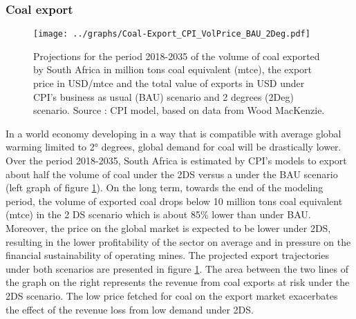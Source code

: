 \documentclass[12pt,english]{article}
\begin{document}
\subsubsection{Coal export}



\begin{figure}[!h]
	\centering
	\texttt{[image: ../graphs/Coal-Export\_CPI\_VolPrice\_BAU\_2Deg.pdf]}
	\caption{\label{Coal-Export_CPI_VolPrice_BAU_2Deg}\small Projections for the period 2018-2035 of the volume of coal exported by South Africa in million tons coal equivalent (mtce), the export price in USD/mtce and the total value of exports in USD under CPI's business as usual (BAU) scenario and 2 degrees (2Deg) scenario. Source : CPI model, based on data from Wood MacKenzie.}
\end{figure}

In a world economy developing in a way that is compatible with average global warming limited to 2° degrees, global demand for coal will be drastically lower. Over the period 2018-2035, South Africa is estimated by CPI's models to export about half the volume of coal under the 2DS versus a under the BAU scenario (left graph of figure \ref{Coal-Export_CPI_VolPrice_BAU_2Deg}). %
On the long term, towards the end of the modeling period, the volume of exported coal drops below 10 million tons coal equivalent (mtce) in the 2 DS scenario which is about 85\% lower than under BAU. Moreover, the price on the global market is expected to be lower under 2DS, resulting in the lower profitability of the sector on average and in pressure %
on the financial sustainability of operating mines. %
The projected export trajectories under both scenarios are presented in figure \ref{Coal-Export_CPI_VolPrice_BAU_2Deg}. The area between the two lines of the graph on the right represents the revenue from coal exports at risk under the 2DS scenario. The low price fetched for coal on the export market exacerbates the effect of the revenue loss from low demand under 2DS. 
\end{document}
